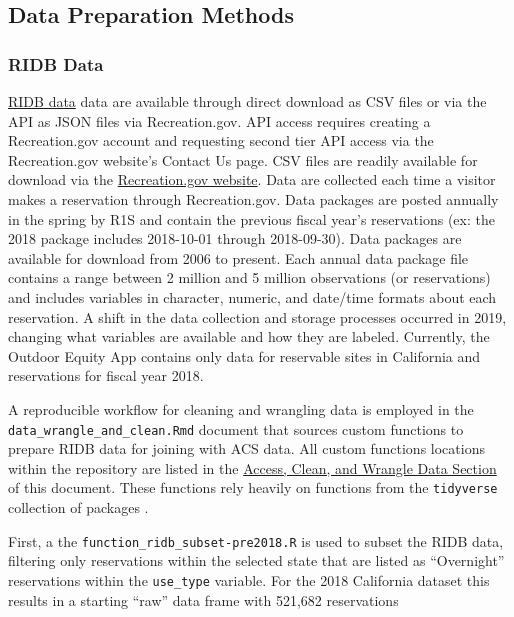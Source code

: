 \documentclass[
]{book}
\begin{document}
\hypertarget{data-preparation-methods}{%
\subsection{Data Preparation Methods}\label{data-preparation-methods}}

\hypertarget{ridb-data}{%
\subsubsection{RIDB Data}\label{ridb-data}}

\href{https://ridb.recreation.gov/landing}{RIDB data} data are available through direct download as CSV files or via the API as JSON files via Recreation.gov. API access requires creating a Recreation.gov account and requesting second tier API access via the Recreation.gov website's Contact Us page. CSV files are readily available for download via the \href{https://ridb.recreation.gov/download}{Recreation.gov website}. Data are collected each time a visitor makes a reservation through Recreation.gov. Data packages are posted annually in the spring by R1S and contain the previous fiscal year's reservations (ex: the 2018 package includes 2018-10-01 through 2018-09-30). Data packages are available for download from 2006 to present. Each annual data package file contains a range between 2 million and 5 million observations (or reservations) and includes variables in character, numeric, and date/time formats about each reservation. A shift in the data collection and storage processes occurred in 2019, changing what variables are available and how they are labeled. Currently, the Outdoor Equity App contains only data for reservable sites in California and reservations for fiscal year 2018.

A reproducible workflow for cleaning and wrangling data is employed in the \texttt{data\_wrangle\_and\_clean.Rmd} document that sources custom functions to prepare RIDB data for joining with ACS data. All custom functions locations within the repository are listed in the \protect\hyperlink{access-clean-and-wrangle-data}{Access, Clean, and Wrangle Data Section} of this document. These functions rely heavily on functions from the \texttt{tidyverse} collection of packages \citep{R-tidyverse}.

First, a the \texttt{function\_ridb\_subset-pre2018.R} is used to subset the RIDB data, filtering only reservations within the selected state that are listed as ``Overnight'' reservations within the \texttt{use\_type} variable. For the 2018 California dataset this results in a starting ``raw'' data frame with 521,682 reservations
\end{document}
